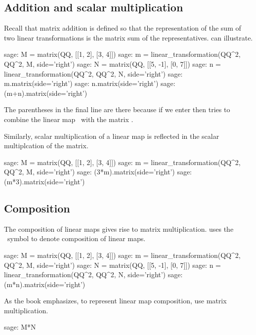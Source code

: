 \subsection{Addition and scalar multiplication}
Recall that matrix addition is defined so that the representation of
the sum of two linear transformations is the matrix sum of the representatives.
\Sage{} can illustrate.
\begin{sagecommandline}
sage: M = matrix(QQ, [[1, 2], [3, 4]])
sage: m = linear_transformation(QQ^2, QQ^2, M, side='right')
sage: N = matrix(QQ, [[5, -1], [0, 7]])
sage: n = linear_transformation(QQ^2, QQ^2, N, side='right')
sage: m.matrix(side='right')
sage: n.matrix(side='right')
sage: (m+n).matrix(side='right')
\end{sagecommandline}
The parentheses in the final line are there because
if we enter  then \Sage{} tries to combine
the linear map~ 
with the matrix .

Similarly, scalar multiplication of a linear map is reflected in 
the scalar multiplcation of the matrix.
\begin{sagecommandline}
sage: M = matrix(QQ, [[1, 2], [3, 4]])
sage: m = linear_transformation(QQ^2, QQ^2, M, side='right')
sage: (3*m).matrix(side='right')
sage: (m*3).matrix(side='right')
\end{sagecommandline}



\subsection{Composition}
The composition of linear maps gives rise to matrix multiplication.
\Sage{} uses the \inlinecode{*}~symbol to denote composition of linear maps.
\begin{sagecommandline}
sage: M = matrix(QQ, [[1, 2], [3, 4]])
sage: m = linear_transformation(QQ^2, QQ^2, M, side='right')
sage: N = matrix(QQ, [[5, -1], [0, 7]])
sage: n = linear_transformation(QQ^2, QQ^2, N, side='right')
sage: (m*n).matrix(side='right')
\end{sagecommandline}

As the book emphasizes, 
to represent linear map composition, use
matrix multiplication.
\begin{sagecommandline}
sage: M*N
\end{sagecommandline}




\endinput


TODO:
